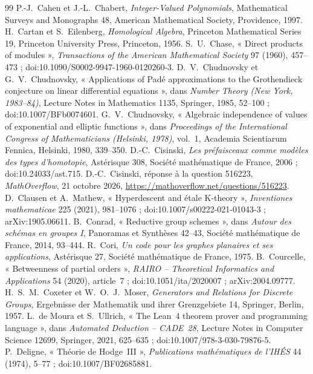 \documentclass[11pt]{article}
\theoremstyle{plain}
\theoremstyle{definition}
\theoremstyle{plain}
\theoremstyle{definition}
\theoremstyle{remark}
\renewcommand{\_}{\bkunderscore\allowbreak}
\begin{document}
\begin{thebibliography}{99}
 P.-J.~Cahen et J.-L.~Chabert, \emph{Integer-Valued Polynomials}, Mathematical Surveys and Monographs 48, American Mathematical Society, Providence, 1997.
 H.~Cartan et S.~Eilenberg, \emph{Homological Algebra}, Princeton Mathematical Series 19, Princeton University Press, Princeton, 1956.
 S.~U.~Chase, « Direct products of modules », \emph{Transactions of the American Mathematical Society} 97 (1960), 457--473 ; doi:10.1090/S0002-9947-1960-0120260-3.
 D.~V.~Chudnovsky et G.~V.~Chudnovsky, « Applications of Padé approximations to the Grothendieck conjecture on linear differential equations », dans \emph{Number Theory (New York, 1983--84)}, Lecture Notes in Mathematics 1135, Springer, 1985, 52--100 ; doi:10.1007/BFb0074601.
 G.~V.~Chudnovsky, « Algebraic independence of values of exponential and elliptic functions », dans \emph{Proceedings of the International Congress of Mathematicians (Helsinki, 1978)}, vol.~1, Academia Scientiarum Fennica, Helsinki, 1980, 339--350.
 D.-C.~Cisinski, \emph{Les préfaisceaux comme modèles des types d'homotopie}, Astérisque 308, Société mathématique de France, 2006 ; doi:10.24033/ast.715.
 D.-C.~Cisinski, réponse à la question 516223, \emph{MathOverflow}, 21 octobre 2026, \url{https://mathoverflow.net/questions/516223}.
 D.~Clausen et A.~Mathew, « Hyperdescent and étale K-theory », \emph{Inventiones mathematicae} 225 (2021), 981--1076 ; doi:10.1007/s00222-021-01043-3 ; arXiv:1905.06611.
 B.~Conrad, « Reductive group schemes », dans \emph{Autour des schémas en groupes I}, Panoramas et Synthèses 42--43, Société mathématique de France, 2014, 93--444.
 R.~Cori, \emph{Un code pour les graphes planaires et ses applications}, Astérisque 27, Société mathématique de France, 1975.
 B.~Courcelle, « Betweenness of partial orders », \emph{RAIRO -- Theoretical Informatics and Applications} 54 (2020), article~7 ; doi:10.1051/ita/2020007 ; arXiv:2004.09777.
 H.~S.~M.~Coxeter et W.~O.~J.~Moser, \emph{Generators and Relations for Discrete Groups}, Ergebnisse der Mathematik und ihrer Grenzgebiete 14, Springer, Berlin, 1957.
 L.~de Moura et S.~Ullrich, « The Lean~4 theorem prover and programming language », dans \emph{Automated Deduction -- CADE~28}, Lecture Notes in Computer Science 12699, Springer, 2021, 625--635 ; doi:10.1007/978-3-030-79876-5\_37.
 P.~Deligne, « Théorie de Hodge~III », \emph{Publications mathématiques de l'IHÉS} 44 (1974), 5--77 ; doi:10.1007/BF02685881.

\end{thebibliography}
\end{document}
